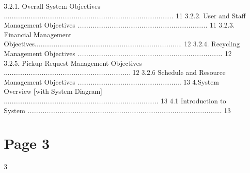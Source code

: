 \documentclass{article}
\begin{document}
3.2.1. Overall System Objectives .......................................................................................... 11 
3.2.2. User and Staff Management Objectives ..................................................................... 11 
3.2.3. Financial Management Objectives.............................................................................. 12 
3.2.4. Recycling Management Objectives ............................................................................. 12 
3.2.5. Pickup Request Management Objectives ................................................................... 12 
3.2.6 Schedule and Resource Management Objectives ....................................................... 13 
4.System Overview [with System Diagram] .................................................................................. 13 
4.1 Introduction to System ....................................................................................................... 13 

\section*{Page 3}
   
 
 3  
 
\end{document}
